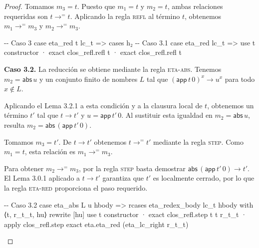\documentclass[
  spanish,
  letterpaper,
  DIV=11,
  numbers=noendperiod]{scrreprt}
\newenvironment{Shaded}{\begin{snugshade}}{\end{snugshade}}
\newcommand{\CommentTok}[1]{\textcolor[rgb]{0.37,0.37,0.37}{#1}}
\newcommand{\KeywordTok}[1]{\textcolor[rgb]{0.00,0.23,0.31}{\textbf{#1}}}
\newcommand{\NormalTok}[1]{\textcolor[rgb]{0.00,0.23,0.31}{#1}}
\renewcommand{\NormalTok}[1]{\textcolor[HTML]{000000}{#1}}
\renewcommand{\KeywordTok}[1]{\textcolor[HTML]{0000FF}{#1}}
\renewcommand{\CommentTok}[1]{\textcolor[HTML]{008000}{#1}}
\theoremstyle{remark}
\begin{document}
\begin{proof}
Tomamos \(m_3=t\). Puesto que \(m_1=t\) y \(m_2=t\), ambas relaciones
requeridas son \(t\longrightarrow^{=}t\). Aplicando la regla
\textsc{refl} al término \(t\), obtenemos \(m_1\longrightarrow^{=}m_3\)
y \(m_2\longrightarrow^{=}m_3\).

\begin{Shaded}
\begin{Highlighting}[]
  \CommentTok{{-}{-} Caso 3}
\NormalTok{  case eta\_red t lc\_t =\textgreater{}}
\NormalTok{    cases h₂}
    \CommentTok{{-}{-} Caso 3.1}
\NormalTok{    case eta\_red lc\_t =\textgreater{}}
\NormalTok{      use t}
\NormalTok{      constructor}
\NormalTok{      · }\KeywordTok{exact}\NormalTok{ clos\_refl.refl t}
\NormalTok{      · }\KeywordTok{exact}\NormalTok{ clos\_refl.refl t}
\end{Highlighting}
\end{Shaded}

\textbf{Caso 3.2.} La reducción se obtiene mediante la regla
\textsc{eta-abs}. Tenemos \(m_2=\mathsf{abs}\,u\) y un conjunto finito
de nombres \(L\) tal que \((\mathsf{app}\,t\,0)^x\longrightarrow u^x\)
para todo \(x\notin L\).

Aplicando el Lema 3.2.1 a esta condición y a la clausura local de \(t\),
obtenemos un término \(t'\) tal que \(t\longrightarrow t'\) y
\(u=\mathsf{app}\,t'\,0\). Al sustituir esta igualdad en
\(m_2=\mathsf{abs}\,u\), resulta
\(m_2=\mathsf{abs}\,(\mathsf{app}\,t'\,0)\).

Tomamos \(m_3=t'\). De \(t\longrightarrow t'\) obtenemos
\(t\longrightarrow^{=}t'\) mediante la regla \textsc{step}. Como
\(m_1=t\), esta relación es \(m_1\longrightarrow^{=}m_3\).

Para obtener \(m_2\longrightarrow^{=}m_3\), por la regla \textsc{step}
basta demostrar
\(\mathsf{abs}\,(\mathsf{app}\,t'\,0)\longrightarrow t'\). El Lema 3.0.1
aplicado a \(t\longrightarrow t'\) garantiza que \(t'\) es localmente
cerrado, por lo que la regla \textsc{eta-red} proporciona el paso
requerido.

\begin{Shaded}
\begin{Highlighting}[]
    \CommentTok{{-}{-} Caso 3.2}
\NormalTok{    case eta\_abs L u hbody =\textgreater{}}
\NormalTok{      rcases eta\_redex\_body lc\_t hbody }\KeywordTok{with}\NormalTok{ ⟨t\textquotesingle{}, r\_t\_t\textquotesingle{}, hu⟩}
      \KeywordTok{rewrite}\NormalTok{ [hu]}
\NormalTok{      use t\textquotesingle{}}
\NormalTok{      constructor}
\NormalTok{      · }\KeywordTok{exact}\NormalTok{ clos\_refl.step t t\textquotesingle{} r\_t\_t\textquotesingle{}}
\NormalTok{      · }\KeywordTok{apply}\NormalTok{ clos\_refl.step}
        \KeywordTok{exact}\NormalTok{ eta.eta\_red (eta\_lc\_right r\_t\_t\textquotesingle{})}
\end{Highlighting}
\end{Shaded}

\end{proof}
\end{document}
